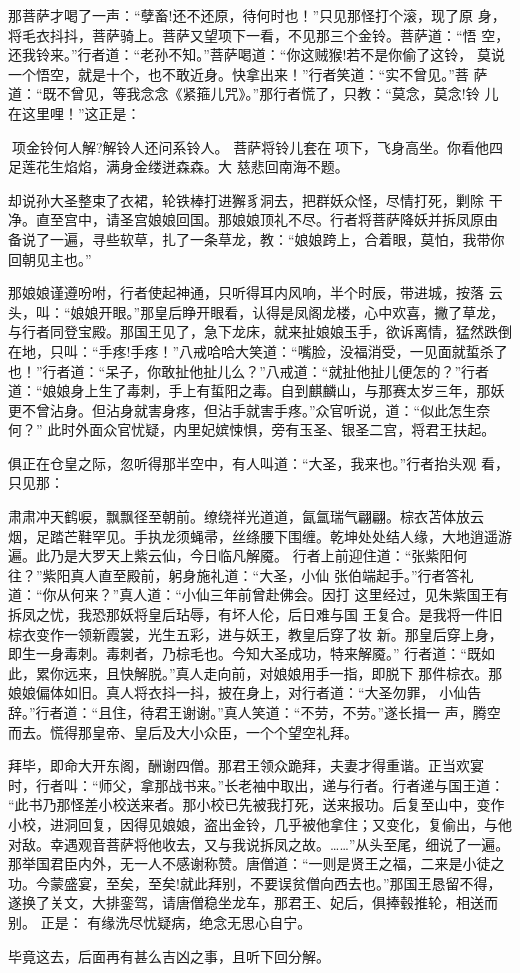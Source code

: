 那菩萨才喝了一声：“孽畜!还不还原，待何时也！”只见那怪打个滚，现了原
身，将毛衣抖抖，菩萨骑上。菩萨又望项下一看，不见那三个金铃。菩萨道：“悟
空，还我铃来。”行者道：“老孙不知。”菩萨喝道：“你这贼猴!若不是你偷了这铃，
莫说一个悟空，就是十个，也不敢近身。快拿出来！”行者笑道：“实不曾见。”菩
萨道：“既不曾见，等我念念《紧箍儿咒》。”那行者慌了，只教：“莫念，莫念!铃
儿在这里哩！”这正是：

项金铃何人解?解铃人还问系铃人。
菩萨将铃儿套在项下，飞身高坐。你看他四足莲花生焰焰，满身金缕迸森森。大
慈悲回南海不题。

却说孙大圣整束了衣裙，轮铁棒打进獬豸洞去，把群妖众怪，尽情打死，剿除
干净。直至宫中，请圣宫娘娘回国。那娘娘顶礼不尽。行者将菩萨降妖并拆凤原由
备说了一遍，寻些软草，扎了一条草龙，教：“娘娘跨上，合着眼，莫怕，我带你
回朝见主也。”

那娘娘谨遵吩咐，行者使起神通，只听得耳内风响，半个时辰，带进城，按落
云头，叫：“娘娘开眼。”那皇后睁开眼看，认得是凤阁龙楼，心中欢喜，撇了草龙，
与行者同登宝殿。那国王见了，急下龙床，就来扯娘娘玉手，欲诉离情，猛然跌倒
在地，只叫：“手疼!手疼！”八戒哈哈大笑道：“嘴脸，没福消受，一见面就蜇杀了
也！”行者道：“呆子，你敢扯他扯儿么？”八戒道：“就扯他扯儿便怎的？”行者
道：“娘娘身上生了毒刺，手上有蜇阳之毒。自到麒麟山，与那赛太岁三年，那妖
更不曾沾身。但沾身就害身疼，但沾手就害手疼。”众官听说，道：“似此怎生奈何？”
此时外面众官忧疑，内里妃嫔悚惧，旁有玉圣、银圣二宫，将君王扶起。

俱正在仓皇之际，忽听得那半空中，有人叫道：“大圣，我来也。”行者抬头观
看，只见那：

肃肃冲天鹤唳，飘飘径至朝前。缭绕祥光道道，氤氲瑞气翩翩。棕衣苫体放云
烟，足踏芒鞋罕见。手执龙须蝇帚，丝绦腰下围缠。乾坤处处结人缘，大地逍遥游
遍。此乃是大罗天上紫云仙，今日临凡解魇。
行者上前迎住道：“张紫阳何往？”紫阳真人直至殿前，躬身施礼道：“大圣，小仙
张伯端起手。”行者答礼道：“你从何来？”真人道：“小仙三年前曾赴佛会。因打
这里经过，见朱紫国王有拆凤之忧，我恐那妖将皇后玷辱，有坏人伦，后日难与国
王复合。是我将一件旧棕衣变作一领新霞裳，光生五彩，进与妖王，教皇后穿了妆
新。那皇后穿上身，即生一身毒刺。毒刺者，乃棕毛也。今知大圣成功，特来解魇。”
行者道：“既如此，累你远来，且快解脱。”真人走向前，对娘娘用手一指，即脱下
那件棕衣。那娘娘偏体如旧。真人将衣抖一抖，披在身上，对行者道：“大圣勿罪，
小仙告辞。”行者道：“且住，待君王谢谢。”真人笑道：“不劳，不劳。”遂长揖一
声，腾空而去。慌得那皇帝、皇后及大小众臣，一个个望空礼拜。

拜毕，即命大开东阁，酬谢四僧。那君王领众跪拜，夫妻才得重谐。正当欢宴
时，行者叫：“师父，拿那战书来。”长老袖中取出，递与行者。行者递与国王道：
“此书乃那怪差小校送来者。那小校已先被我打死，送来报功。后复至山中，变作
小校，进洞回复，因得见娘娘，盗出金铃，几乎被他拿住；又变化，复偷出，与他
对敌。幸遇观音菩萨将他收去，又与我说拆凤之故。……”从头至尾，细说了一遍。
那举国君臣内外，无一人不感谢称赞。唐僧道：“一则是贤王之福，二来是小徒之
功。今蒙盛宴，至矣，至矣!就此拜别，不要误贫僧向西去也。”那国王恳留不得，
遂换了关文，大排銮驾，请唐僧稳坐龙车，那君王、妃后，俱捧毂推轮，相送而别。
正是：
有缘洗尽忧疑病，绝念无思心自宁。

毕竟这去，后面再有甚么吉凶之事，且听下回分解。
